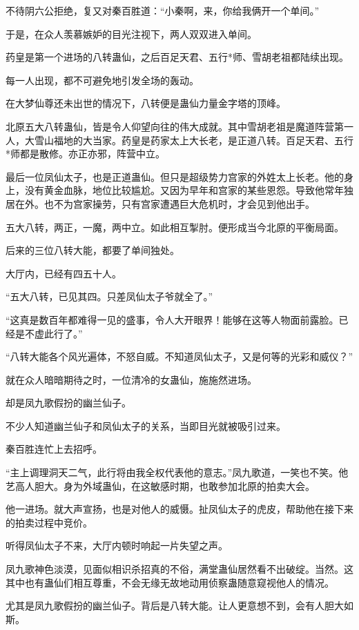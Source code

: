 \begin{this_body}
不待阴六公拒绝，复又对秦百胜道：“小秦啊，来，你给我俩开一个单间。”

于是，在众人羡慕嫉妒的目光注视下，两人双双进入单间。

药皇是第一个进场的八转蛊仙，之后百足天君、五行*师、雪胡老祖都陆续出现。

每一人出现，都不可避免地引发全场的轰动。

在大梦仙尊还未出世的情况下，八转便是蛊仙力量金字塔的顶峰。

北原五大八转蛊仙，皆是令人仰望向往的伟大成就。其中雪胡老祖是魔道阵营第一人，大雪山福地的大当家。药皇是药家太上大长老，是正道八转。百足天君、五行*师都是散修。亦正亦邪，阵营中立。

最后一位凤仙太子，也是正道蛊仙。但只是超级势力宫家的外姓太上长老。他的身上，没有黄金血脉，地位比较尴尬。又因为早年和宫家的某些恩怨。导致他常年独居在外。也不为宫家操劳，只有宫家遭遇巨大危机时，才会见到他出手。

五大八转，两正，一魔，两中立。如此相互掣肘。便形成当今北原的平衡局面。

后来的三位八转大能，都要了单间独处。

大厅内，已经有四五十人。

“五大八转，已见其四。只差凤仙太子爷就全了。”

“这真是数百年都难得一见的盛事，令人大开眼界！能够在这等人物面前露脸。已经是不虚此行了。”

“八转大能各个风光遍体，不怒自威。不知道凤仙太子，又是何等的光彩和威仪？”

就在众人暗暗期待之时，一位清冷的女蛊仙，施施然进场。

却是凤九歌假扮的幽兰仙子。

不少人知道幽兰仙子和凤仙太子的关系，当即目光就被吸引过来。

秦百胜连忙上去招呼。

“主上调理洞天二气，此行将由我全权代表他的意志。”凤九歌道，一笑也不笑。他艺高人胆大。身为外域蛊仙，在这敏感时期，也敢参加北原的拍卖大会。

他一进场。就大声宣扬，也是对他人的威慑。扯凤仙太子的虎皮，帮助他在接下来的拍卖过程中竞价。

听得凤仙太子不来，大厅内顿时响起一片失望之声。

凤九歌神色淡漠，见面似相识杀招真的不俗，满堂蛊仙居然看不出破绽。当然。这其中也有蛊仙们相互尊重，不会无缘无故地动用侦察蛊随意窥视他人的情况。

尤其是凤九歌假扮的幽兰仙子。背后是八转大能。让人更意想不到，会有人胆大如斯。


\end{this_body}
